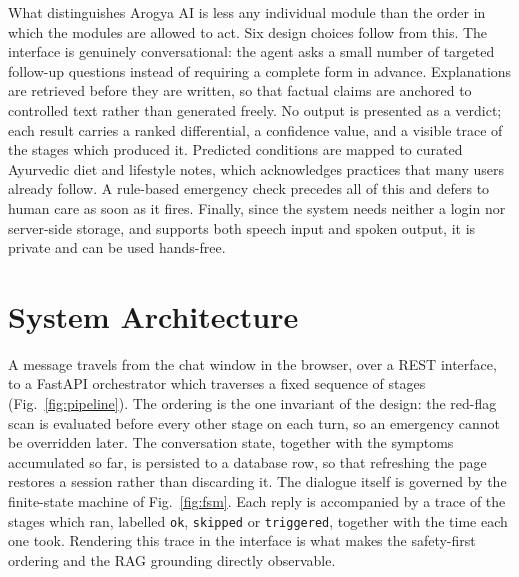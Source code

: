 \documentclass[conference]{IEEEtran}
\newcommand{\code}[1]{\texttt{\small #1}}
\begin{document}
What distinguishes Arogya AI is less any individual module than the order in
which the modules are allowed to act. Six design choices follow from this.
The interface is genuinely conversational: the agent asks a small number of
targeted follow-up questions instead of requiring a complete form in advance.
Explanations are retrieved before they are written, so that factual claims
are anchored to controlled text rather than generated freely. No output is
presented as a verdict; each result carries a ranked differential, a
confidence value, and a visible trace of the stages which produced it.
Predicted conditions are mapped to curated Ayurvedic diet and lifestyle
notes, which acknowledges practices that many users already follow. A
rule-based emergency check precedes all of this and defers to human care as
soon as it fires. Finally, since the system needs neither a login nor
server-side storage, and supports both speech input and spoken output, it is
private and can be used hands-free.

\section{System Architecture}

A message travels from the chat window in the browser, over a REST interface,
to a FastAPI orchestrator which traverses a fixed sequence of stages
(Fig.~\ref{fig:pipeline}). The ordering is the one invariant of the design:
the red-flag scan is evaluated before every other stage on each turn, so an
emergency cannot be overridden later. The conversation state, together with
the symptoms accumulated so far, is persisted to a database row, so that
refreshing the page restores a session rather than discarding it. The
dialogue itself is governed by the finite-state machine of
Fig.~\ref{fig:fsm}. Each reply is accompanied by a trace of the stages which
ran, labelled \code{ok}, \code{skipped} or \code{triggered}, together with
the time each one took. Rendering this trace in the interface is what makes
the safety-first ordering and the RAG grounding directly observable.
\end{document}
